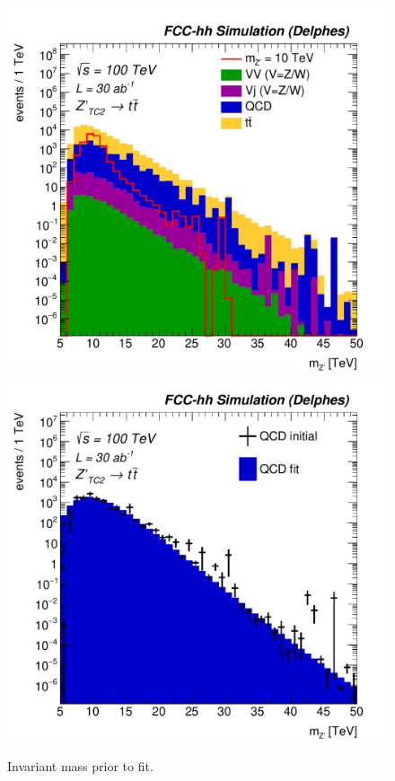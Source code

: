 \begin{figure}[!htb]\centering
\includegraphics[width=0.49\columnwidth]{Fig/Zptt/Mj1j2_pf08_MetCorr_sel8_nostack_log-eps-converted-to.pdf}
\includegraphics[width=0.49\columnwidth]{Fig/Zptt/Zptt_QCD_sel8_Mj1j2_pf08_MetCorr_fit-eps-converted-to.pdf}
\caption{Invariant mass prior to fit.}
\label{fig:hadronicresonances_nofit}
\end{figure}



